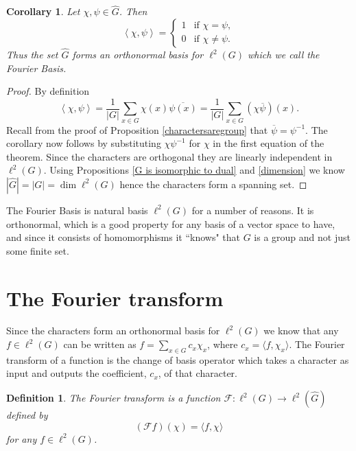 \documentclass[12pt]{article}
\newtheorem{Definition}{Definition}
\newtheorem{Corollary}{Corollary}
\begin{document}
\begin{Corollary} \label{dual forms orthonormal basis}%
    Let $\chi,\psi\in \widehat{G}$.
    Then
    \[
        \left<\chi,\psi\right>
        =
        \begin{cases}
            1 & \text{if } \chi=\psi,    \\
            0 & \text{if }\chi\neq \psi.
        \end{cases}
    \]
    Thus the set $\widehat{G}$ forms an orthonormal basis for $\ell^2(G)$ which we call the Fourier Basis.
\end{Corollary}
\begin{proof}
    By definition
    \[
        \left<\chi,\psi\right>
        =\frac{1}{|G|}\sum_{x\in G}\chi(x)\overline{\psi(x)}
        =\frac{1}{|G|}\sum_{x\in G}(\chi\overline{\psi})(x).
    \]
    Recall from the proof of Proposition \ref{charactersaregroup} that $\overline{\psi} = \psi^{-1}$.
    The corollary now follows by substituting $\chi\psi^{-1}$ for $\chi$ in the first equation of the theorem.
    Since the characters are orthogonal they are linearly independent in $\ell^2(G)$.
    Using Propositions \ref{G is isomorphic to dual}  and \ref{dimension} we know $|\widehat{G}| = |G| = \dim \ell^2(G)$ hence the characters form a spanning set.
\end{proof}

The Fourier Basis is natural basis $\ell^2(G)$ for a number of reasons.
It is orthonormal, which is a good property for any basis of a vector space to have, and since it consists of homomorphisms it ``knows" that $G$ is a group and not just some finite set.


\section{The Fourier transform}
Since the characters form an orthonormal basis for $\ell^2(G)$ we know that any $f\in \ell^2(G)$ can be written as $f=\sum_{x\in G} c_x \chi_x$, where $c_x = \langle f, \chi_x \rangle$.
The Fourier transform of a function is the change of basis operator  which takes a character as input and outputs the coefficient, $c_x$, of that character.



\begin{Definition} %
    The Fourier transform is a function  $\mathscr{F}: \ell^2(G) \to \ell^2(\widehat{G})$ defined by
    \[
        (\mathscr{F}f)(\chi)=\langle f,\chi \rangle
    \]
    for any $f\in \ell^2(G)$.
\end{Definition}
\end{document}
